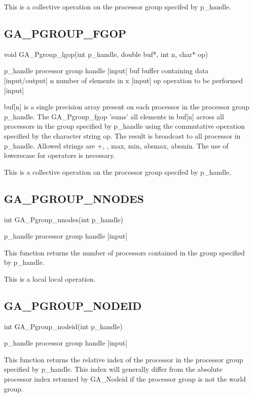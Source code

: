 This is a collective operation on the processor group specifed by
p\_handle.


\subsection*{GA\_PGROUP\_FGOP}

void GA\_Pgroup\_lgop(int p\_handle, double buf{*}, int n, char{*}
op)

p\_handle processor group handle {[}input{]} buf buffer containing
data {[}input/output{]} n number of elements in x {[}input{]} op operation
to be performed {[}input{]}

buf{[}n{]} is a single precision array present on each processor in
the processor group p\_handle. The GA\_Pgroup\_fgop 'sums' all elements
in buf{[}n{]} across all processors in the group specified by p\_handle
using the commutative operation specified by the character string
op. The result is broadcast to all processor in p\_handle. Allowed
strings are \textquotedbl{}+\textquotedbl{}, \textquotedbl{}{*}\textquotedbl{},
\textquotedbl{}max\textquotedbl{}, \textquotedbl{}min\textquotedbl{},
\textquotedbl{}absmax\textquotedbl{}, \textquotedbl{}absmin\textquotedbl{}.
The use of lowerecase for operators is necessary.

This is a collective operation on the processor group specifed by
p\_handle. 


\subsection*{GA\_PGROUP\_NNODES}

int GA\_Pgroup\_nnodes(int p\_handle)

p\_handle processor group handle {[}input{]}

This function returns the number of processors contained in the group
specified by p\_handle.

This is a local local operation. 


\subsection*{GA\_PGROUP\_NODEID}

int GA\_Pgroup\_nodeid(int p\_handle)

p\_handle processor group handle {[}input{]}

This function returns the relative index of the processor in the processor
group specified by p\_handle. This index will generally differ from
the absolute processor index returned by GA\_Nodeid if the processor
group is not the world group.

